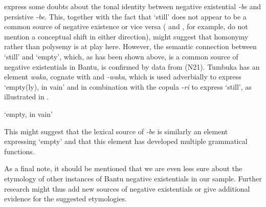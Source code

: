 \documentclass[output=paper,draft,draftmode,colorlinks,citecolor=brown]{langscibook}
\begin{document}
%
\citet[279]{StevickHollander1965} express
some doubts about the tonal identity between negative existential
\textit{-be} and persistive \textit{-be}. This, together with the fact that
`still' does not appear to be a common source of negative existence or vice
versa (\citealt{HeineGuldemann1993} and \citealt{HeineKuteva2002}, for
example, do not mention a conceptual shift in either direction), might
suggest that homonymy rather than polysemy is at play here. However, the
semantic connection between `still' and `empty', which, as has been shown
above, is a common source of negative existentials in Bantu, is confirmed
by data from  (N21). Tumbuka has an element \textit{waka},
cognate with  and  \textit{-waka}, which is used
adverbially to express `empty(ly), in vain' and in combination with the copula
\textit{-ri} to express `still', as illustrated in
.  \begin{exe}
\ex\label{ex:tumbuka-empty-persist}  \begin{xlist}
\ex `empty, in vain'
\begin{xlist}
 \end{xlist}
\end{xlist} \end{exe} 
%
This might suggest that the lexical source of \textit{-be} is similarly an
element expressing `empty' and that this element has developed multiple
grammatical functions.

As a final note, it should be mentioned that we are even less sure about
the etymology of other instances of Bantu negative existentials in our
sample. Further research might thus add new sources of negative existentials or give additional evidence for the suggested etymologies.
\end{document}
